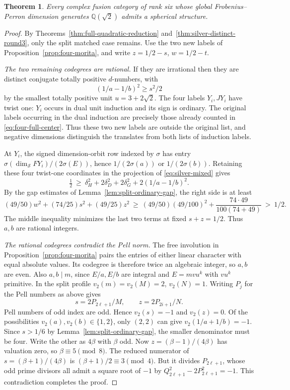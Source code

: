 \documentclass[11pt,reqno]{amsart}
\newtheorem{theorem}{Theorem}[section]
\theoremstyle{remark}\newtheorem{remark}[theorem]{Remark}
\numberwithin{equation}{section}
\begin{document}
\begin{theorem}\label{thm:silver-morita-end}
Every complex fusion category of rank six whose global Frobenius--Perron
dimension generates $\mathbb Q(\sqrt2)$ admits a spherical structure.
\end{theorem}
\begin{proof}
By Theorems~\ref{thm:full-quadratic-reduction}
and~\ref{thm:silver-distinct-round3}, only the split matched case
remains. Use the two new labels of Proposition~\ref{prop:four-morita},
and write $z=1/2-s$, $w=1/2-t$.

\smallskip\noindent\emph{The two remaining codegrees are rational.}
If they are irrational then they are distinct conjugate totally
positive $d$-numbers, with
\[
                  (1/a-1/b)^2\ge s^2/2
\]
by the smallest totally positive unit $u=3+2\sqrt2$.
The four labels $Y_i,JY_i$ have twist one: $Y_i$ occurs in dual
unit induction and its sign is ordinary. The original labels
occurring in the dual induction are precisely those already counted
in \eqref{eq:four-full-center}. Thus these two new labels are outside
the original list, and negative dimensions distinguish the translates
from both lists of induction labels.

At $Y_i$, the signed dimension-orbit row indexed by $\sigma$ has entry
$\sigma(\dim_{\mathcal S}FY_i)/(2\sigma(E))$, hence $1/(2\sigma(a))$
or $1/(2\sigma(b))$. Retaining these four twist-one coordinates
in the projection of \eqref{eq:silver-mixed} gives
\[
\tfrac12\ \ge\ \delta_H^2+2\delta_D^2+2\delta_G^2+2(1/a-1/b)^2 .
\]
By the gap estimates of Lemma~\ref{lem:split-ordinary-gap},
the right side is at least
\[
   (49/50)w^2+(74/25)s^2+(49/25)z^2
   \ \ge\ (49/50)(49/100)^2+\frac{74\cdot49}{100(74+49)}
   \ >\ 1/2.
\]
The middle inequality minimizes the last two terms at fixed
$s+z=1/2$. Thus $a,b$ are rational integers.

\smallskip\noindent\emph{The rational codegrees contradict the Pell norm.}
The free involution in Proposition~\ref{prop:four-morita} pairs
the entries of either linear character with equal absolute values.
Its codegree is therefore twice an algebraic integer, so $a,b$ are
even. Also $a,b\mid m$, since $E/a,E/b$ are integral and
$E=mvu^k$ with $vu^k$ primitive. In the split profile
$v_2(m)=v_2(M)=2$, $v_2(N)=1$. Writing $P_j$ for the Pell
numbers as above gives
\[
     s=2P_{2\ell+1}/M,\qquad z=2P_{2i+1}/N .
\]
Pell numbers of odd index are odd. Hence $v_2(s)=-1$ and
$v_2(z)=0$. Of the possibilities $v_2(a),v_2(b)\in\{1,2\}$,
only $(2,2)$ can give $v_2(1/a+1/b)=-1$.
Since $s>1/6$ by Lemma~\ref{lem:split-ordinary-gap}, the smaller
denominator must be four. Write the other as $4\beta$ with
$\beta$ odd. Now $z=(\beta-1)/(4\beta)$ has valuation zero,
so $\beta\equiv5\pmod8$. The reduced numerator of
$s=(\beta+1)/(4\beta)$ is $(\beta+1)/2\equiv3\pmod4$.
But it divides $P_{2\ell+1}$, whose odd prime divisors all admit
a square root of $-1$ by $Q_{2\ell+1}^2-2P_{2\ell+1}^2=-1$.
This contradiction completes the proof.
\end{proof}
\end{document}
